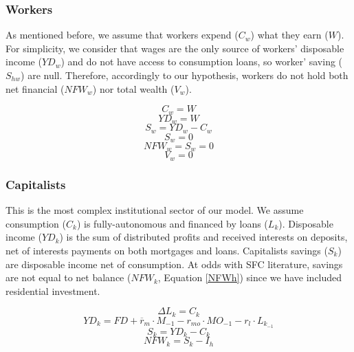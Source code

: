 \documentclass[12pt]{article}
\begin{document}
\subsubsection{Workers}
\label{sec:orgc5b5f5f}

As mentioned before, we assume that workers expend (\(C_w\)) what they earn (\(W\)). 
For simplicity, we consider that wages are the only source of workers' disposable income (\(YD_{w}\)) and do not have access to consumption loans, so worker' saving (\(S_{hw}\)) are null.
Therefore, accordingly to our hypothesis, workers do not hold both net financial (\(NFW_{w}\)) nor total wealth (\(V_{w}\)).

\begin{equation}
C_w = W
\end{equation}
\begin{equation}
YD_w = W
\end{equation}
\begin{equation}
S_{w} = YD_w - C_w
\end{equation}
$$
S_{w} = 0
$$
\begin{equation}
NFW_{w} = S_{w} = 0
\end{equation}
\begin{equation}
V_{w} = 0
\end{equation}

\subsubsection{Capitalists}
\label{sec:orgfb93484}

This is the most complex institutional sector of our model. 
We assume consumption (\(C_k\)) is fully-autonomous and financed by loans (\(L_{k}\)). 
Disposable income (\(YD_k\)) is the sum of distributed profits and received interests on deposits, net of interests payments
on both mortgages and loans.
Capitalists savings (\(S_{k}\)) are disposable income net of consumption.
At odds with SFC literature, savings are not equal to net balance (\(NFW_{k}\), Equation \ref{NFWh}) since we have included residential investment.

\begin{equation}
\Delta L_{k} = C_k
\end{equation}
\begin{equation}
    \label{EqYD}
    YD_k = FD + \overline r_m\cdot M_{-1} - r_{mo}\cdot MO_{-1} - r_{l}\cdot L_{k_{-1}}
\end{equation}
\begin{equation}
    \label{EqSh}
    S_{k} = YD_k - C_k
\end{equation}
\begin{equation}
\label{NFWh}
    NFW_{k} = S_{k} - I_h
\end{equation}
\end{document}
